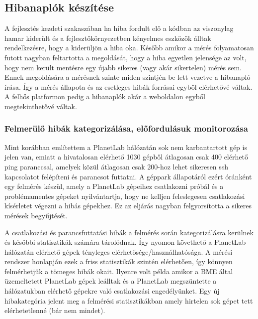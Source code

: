 \subsection*{Hibanaplók készítése}
A fejlesztés kezdeti szakaszában ha hiba fordult elő a kódban az viszonylag hamar kiderült és a fejlesztőkörnyezetben kényelmes eszközök álltak rendelkezésre, hogy a kiderüljön a hiba oka. Később amikor a mérés folyamatosan futott nagyban feltartotta a megoldását, hogy a hiba egyetlen jelensége az volt, hogy nem került mentésre egy újabb sikeres (vagy akár sikertelen) mérés sem. Ennek megoldására a mérésnek szinte miden szintjén be lett vezetve a hibanapló írása. Így a mérés állapota és az esetleges hibák forrásai egyből elérhetővé váltak. A felhős platformon pedig a hibanaplók akár a weboldalon egyből megtekinthetővé váltak.

\subsubsection*{Felmerülő hibák kategorizálása, előfordulásuk monitorozása}
Mint korábban említettem a PlanetLab hálózatán sok nem karbantartott gép is jelen van, emiatt a hivatalosan elérhető 1030 gépből átlagosan csak 400 elérhető ping paranccsal, amelyek közül átlagosan csak 200-hoz lehet sikeresen ssh kapcsolatot felépíteni és parancsot futtatni. A géppark állapotáról ezért óránként egy felmérés készül, amely a PlanetLab gépeihez csatlakozni próbál és a problémamentes gépeket nyilvántartja, hogy ne kelljen feleslegesen csatlakozási kísérletet végezni a hibás gépekhez. Ez az eljárás nagyban felgyorsította a sikeres mérések begyűjtését.

A csatlakozási és parancsfuttatási hibák a felmérés során kategorizálásra kerülnek és későbbi statisztikák számára tárolódnak. Így nyomon követhető a PlanetLab hálózatán elérhető gépek tényleges elérhetősége/használhatósága.
A mérési rendszer honlapján ezek a friss statisztikák szintén elérhetően, így könnyen felmérhetjük a tömeges hibák okait. Ilyenre volt példa amikor a BME által üzemeltetett PlanetLab gépek leálltak és a PlanetLab megszüntette a hálózatukban elérhető gépekre való csatlakozási engedélyünket. Egy új hibakategória jelent meg a felmérési statisztikákban amely hirtelen sok gépet tett elérhetetlenné (bár nem mindet).
